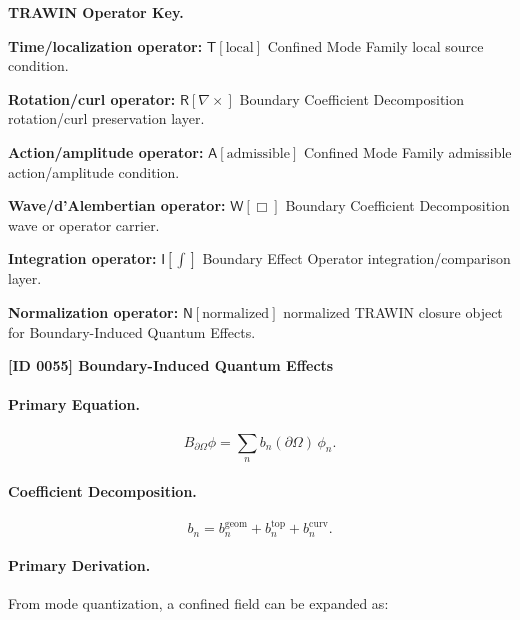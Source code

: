 \par\vspace{0.45\baselineskip}
\noindent\begin{minipage}[t]{\linewidth}
\begingroup
\small
\raggedright
\textbf{TRAWIN Operator Key.}\par
\noindent\textbf{Time/localization operator:} $\mathsf{T}\!\left[\mathrm{local}\right]$ Confined Mode Family local source condition.\par
\noindent\textbf{Rotation/curl operator:} $\mathsf{R}\!\left[\nabla\times\right]$ Boundary Coefficient Decomposition rotation/curl preservation layer.\par
\noindent\textbf{Action/amplitude operator:} $\mathsf{A}\!\left[\mathrm{admissible}\right]$ Confined Mode Family admissible action/amplitude condition.\par
\noindent\textbf{Wave/d'Alembertian operator:} $\mathsf{W}\!\left[\Box\right]$ Boundary Coefficient Decomposition wave or operator carrier.\par
\noindent\textbf{Integration operator:} $\mathsf{I}\!\left[\int\right]$ Boundary Effect Operator integration/comparison layer.\par
\noindent\textbf{Normalization operator:} $\mathsf{N}\!\left[\mathrm{normalized}\right]$ normalized TRAWIN closure object for Boundary-Induced Quantum Effects.\par
\endgroup
\end{minipage}

\clearpage
\noindent\textbf{[ID 0055] Boundary-Induced Quantum Effects}\par
\vspace{0.35em}
\paragraph{Primary Equation.}
\begin{equation}
B_{\partial\Omega}\phi
=
\sum_n b_n(\partial\Omega)\,\phi_n .
\end{equation}

\paragraph{Coefficient Decomposition.}
\begin{equation}
b_n
=
b_n^{\mathrm{geom}}
+
b_n^{\mathrm{top}}
+
b_n^{\mathrm{curv}} .
\end{equation}

\paragraph{Primary Derivation.}
From mode quantization, a confined field can be expanded as:

